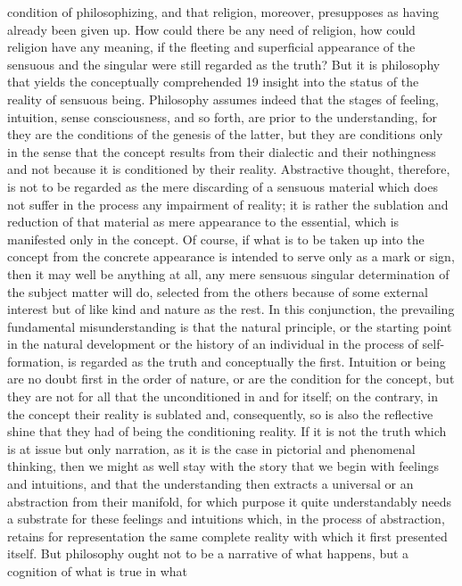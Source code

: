 condition of philosophizing, and that religion, moreover, presupposes as
having already been given up. How could there be any need of religion, how
could religion have any meaning, if the fleeting and superficial appearance
of the sensuous and the singular were still regarded as the truth? But it
is philosophy that yields the conceptually comprehended 19 insight into the
status of the reality of sensuous being. Philosophy assumes indeed that the
stages of feeling, intuition, sense consciousness, and so forth, are prior to
the understanding, for they are the conditions of the genesis of the latter,
but they are conditions only in the sense that the concept results from
their dialectic and their nothingness and not because it is conditioned by
their reality. Abstractive thought, therefore, is not to be regarded as the
mere discarding of a sensuous material which does not suffer in the process
any impairment of reality; it is rather the sublation and reduction of that
material as mere appearance to the essential, which is manifested only in
the concept. Of course, if what is to be taken up into the concept from the
concrete appearance is intended to serve only as a mark or sign, then it may
well be anything at all, any mere sensuous singular determination of the
subject matter will do, selected from the others because of some external
interest but of like kind and nature as the rest.
In this conjunction, the prevailing fundamental misunderstanding is
that the natural principle, or the starting point in the natural development
or the history of an individual in the process of self-formation, is regarded
as the truth and conceptually the first. Intuition or being are no doubt first
in the order of nature, or are the condition for the concept, but they
are not for all that the unconditioned in and for itself; on the contrary,
in the concept their reality is sublated and, consequently, so is also the
reflective shine that they had of being the conditioning reality. If it is not
the truth which is at issue but only narration, as it is the case in pictorial and
phenomenal thinking, then we might as well stay with the story that we
begin with feelings and intuitions, and that the understanding then extracts
a universal or an abstraction from their manifold, for which purpose it quite
understandably needs a substrate for these feelings and intuitions which,
in the process of abstraction, retains for representation the same complete
reality with which it first presented itself. But philosophy ought not to
be a narrative of what happens, but a cognition of what is true in what
